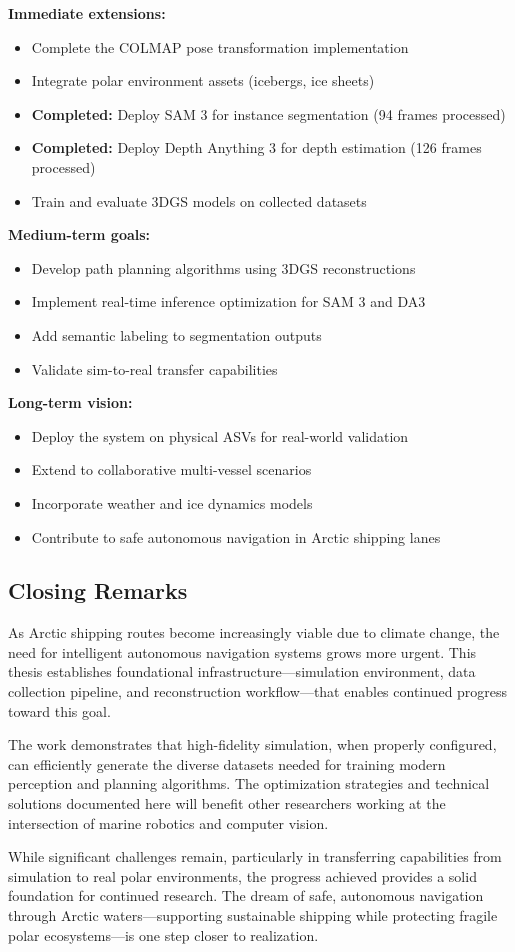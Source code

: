\textbf{Immediate extensions:}
\begin{itemize}
    \item Complete the COLMAP pose transformation implementation
    \item Integrate polar environment assets (icebergs, ice sheets)
    \item \textbf{Completed:} Deploy SAM 3 for instance segmentation (94 frames processed)
    \item \textbf{Completed:} Deploy Depth Anything 3 for depth estimation (126 frames processed)
    \item Train and evaluate 3DGS models on collected datasets
\end{itemize}

\textbf{Medium-term goals:}
\begin{itemize}
    \item Develop path planning algorithms using 3DGS reconstructions
    \item Implement real-time inference optimization for SAM 3 and DA3
    \item Add semantic labeling to segmentation outputs
    \item Validate sim-to-real transfer capabilities
\end{itemize}

\textbf{Long-term vision:}
\begin{itemize}
    \item Deploy the system on physical ASVs for real-world validation
    \item Extend to collaborative multi-vessel scenarios
    \item Incorporate weather and ice dynamics models
    \item Contribute to safe autonomous navigation in Arctic shipping lanes
\end{itemize}

\subsection{Closing Remarks}

As Arctic shipping routes become increasingly viable due to climate change, the need for intelligent autonomous navigation systems grows more urgent. This thesis establishes foundational infrastructure---simulation environment, data collection pipeline, and reconstruction workflow---that enables continued progress toward this goal.

The work demonstrates that high-fidelity simulation, when properly configured, can efficiently generate the diverse datasets needed for training modern perception and planning algorithms. The optimization strategies and technical solutions documented here will benefit other researchers working at the intersection of marine robotics and computer vision.

While significant challenges remain, particularly in transferring capabilities from simulation to real polar environments, the progress achieved provides a solid foundation for continued research. The dream of safe, autonomous navigation through Arctic waters---supporting sustainable shipping while protecting fragile polar ecosystems---is one step closer to realization.
